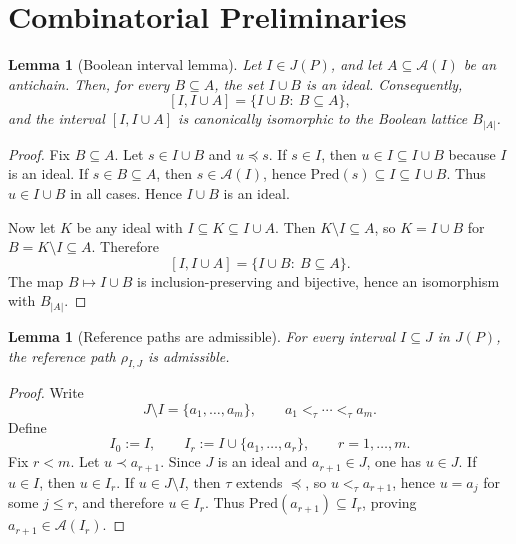 \documentclass{article}
\newtheorem{lemma}[theorem]{Lemma}
\theoremstyle{definition}
\begin{document}
\newpage
\appendix

\section{Combinatorial Preliminaries}
\label{app:comb}

\begin{lemma}[Boolean interval lemma]
\label{lem:boolean-interval-app}
Let \(I\in J(P)\), and let \(A\subseteq \mathcal A(I)\) be an antichain. Then, for every \(B\subseteq A\), the set \(I\cup B\) is an ideal. Consequently,
\[
[I,I\cup A]
=
\{I\cup B:\ B\subseteq A\},
\]
and the interval \([I,I\cup A]\) is canonically isomorphic to the Boolean lattice \(B_{|A|}\).
\end{lemma}

\begin{proof}
Fix \(B\subseteq A\). Let \(s\in I\cup B\) and \(u\preceq s\). If \(s\in I\), then \(u\in I\subseteq I\cup B\) because \(I\) is an ideal. If \(s\in B\subseteq A\), then \(s\in \mathcal A(I)\), hence \(\mathrm{Pred}(s)\subseteq I\subseteq I\cup B\). Thus \(u\in I\cup B\) in all cases. Hence \(I\cup B\) is an ideal.

Now let \(K\) be any ideal with \(I\subseteq K\subseteq I\cup A\). Then \(K\setminus I\subseteq A\), so \(K=I\cup B\) for \(B=K\setminus I\subseteq A\). Therefore
\[
[I,I\cup A]=\{I\cup B:\ B\subseteq A\}.
\]
The map \(B\mapsto I\cup B\) is inclusion-preserving and bijective, hence an isomorphism with \(B_{|A|}\).
\end{proof}

\begin{lemma}[Reference paths are admissible]
\label{lem:ref-path-admissible}
For every interval \(I\subseteq J\) in \(J(P)\), the reference path \(\rho_{I,J}\) is admissible.
\end{lemma}

\begin{proof}
Write
\[
J\setminus I=\{a_1,\dots,a_m\},
\qquad
a_1<_{\tau}\cdots<_{\tau} a_m.
\]
Define
\[
I_0:=I,\qquad I_r:=I\cup\{a_1,\dots,a_r\},
\qquad r=1,\dots,m.
\]
Fix \(r<m\). Let \(u\prec a_{r+1}\). Since \(J\) is an ideal and \(a_{r+1}\in J\), one has \(u\in J\). If \(u\in I\), then \(u\in I_r\). If \(u\in J\setminus I\), then \(\tau\) extends \(\preceq\), so \(u<_{\tau}a_{r+1}\), hence \(u=a_j\) for some \(j\le r\), and therefore \(u\in I_r\). Thus \(\mathrm{Pred}(a_{r+1})\subseteq I_r\), proving \(a_{r+1}\in \mathcal A(I_r)\).
\end{proof}
\end{document}
